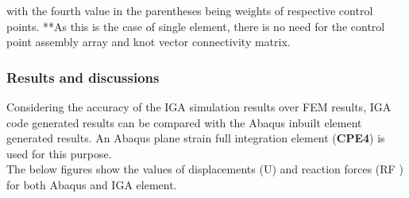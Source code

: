 \documentclass[11pt]{article}
\begin{document}
\begin{enumerate}
\begin{center}
\begin{tabular}{ |c|c|c|c|c| }
		\end{tabular}
	\end{center}
	with the fourth value in the parentheses being weights of respective control points.
	**As this is the case of single element, there is no need for the control point
	assembly array and knot vector connectivity matrix.
\end{enumerate}
\subsubsection{Results and discussions}
Considering the accuracy of the IGA simulation results over FEM results, IGA code generated results can be compared with the Abaqus inbuilt element generated results. An Abaqus plane strain full integration element (\textbf{CPE4}) \cite{abaqus10version} is used for this purpose.
\\The below figures show the values of displacements (U) and reaction forces (RF ) for both Abaqus and IGA element.\\
\end{document}
